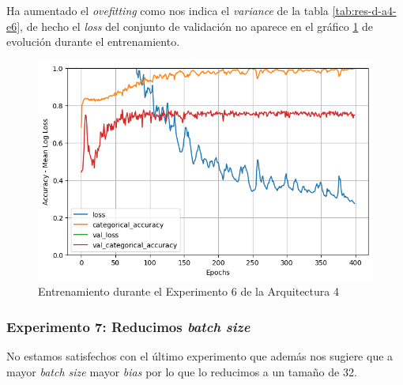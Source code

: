 \documentclass{article}
\begin{document}
			Ha aumentado el \textit{ovefitting} como nos indica el \textit{variance} de la tabla \ref{tab:res-d-a4-e6}, de hecho el \textit{loss} del conjunto de validaci\'on no aparece en el gr\'afico \ref{d-tr-a4-e6} de evoluci\'on durante el entrenamiento.
			\begin{figure}[!h]
				\begin{center}
					\includegraphics[scale=0.4]{d-tr-a4-e6.png}		
					\caption{Entrenamiento durante el Experimento 6 de la Arquitectura 4}	
					\label{d-tr-a4-e6}
				\end{center}
			\end{figure}
        
        \subsubsection{Experimento 7: Reducimos \textit{batch size}}
        \label{d-s-a4-e7}
			No estamos satisfechos con el \'ultimo experimento que adem\'as nos sugiere que a mayor \textit{batch size} mayor \textit{bias} por lo que lo reducimos a un tama\~no de 32.
			
\end{document}
